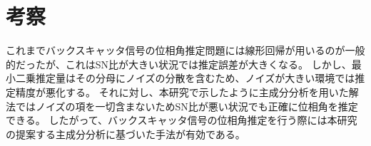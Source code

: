 \documentclass[a4j,10pt]{jsarticle}
\begin{document}
\section{考察}
これまでバックスキャッタ信号の位相角推定問題には線形回帰が用いるのが一般的だったが、これはSN比が大きい状況では推定誤差が大きくなる。
しかし、最小二乗推定量はその分母にノイズの分散を含むため、ノイズが大きい環境では推定精度が悪化する。
それに対し、本研究で示したように主成分分析を用いた解法ではノイズの項を一切含まないためSN比が悪い状況でも正確に位相角を推定できる。
したがって、バックスキャッタ信号の位相角推定を行う際には本研究の提案する主成分分析に基づいた手法が有効である。



\end{document}
